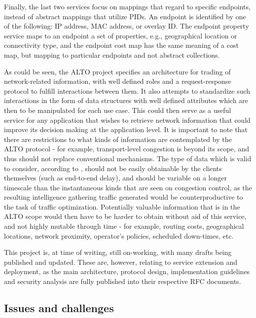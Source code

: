 \documentclass[
  oneside,
  11pt, a4paper,
  footinclude=true,
  headinclude=true,
  cleardoublepage=empty
]{scrbook}
\begin{document}
    Finally, the last two services focus on mappings that regard to specific endpoints, instead of abstract mappings that utilize PIDs. An endpoint is identified by one of the following: IP address, MAC address, or overlay ID. The endpoint property service maps to an endpoint a set of properties, e.g., geographical location or connectivity type, and the endpoint cost map has the same meaning of a cost map, but mapping to particular endpoints and not abstract collections.

    
    As could be seen, the ALTO project specifies an architecture for trading of network-related information, with well defined roles and a request-response protocol to fulfill interactions between them. It also attempts to standardize such interactions in the form of data structures with well defined attributes which are then to be manipulated for each use case. This could then serve as a useful service for any application that wishes to retrieve network information that could improve its decision making at the application level. It is important to note that there are restrictions to what kinds of information are contemplated by the ALTO protocol - for example, transport-level congestion is beyond its scope, and thus should not replace conventional mechanisms. The type of data which is valid to consider, according to \cite{alto-protocol}, should not be easily obtainable by the clients themselves (such as end-to-end delay), and should be variable on a longer timescale than the instantaneous kinds that are seen on congestion control, as the resulting intelligence gathering traffic generated would be counterproductive to the task of traffic optimization. Potentially valuable information that is in the ALTO scope would then have to be harder to obtain without aid of this service, and not highly mutable through time - for example, routing costs, geographical locations, network proximity, operator's policies, scheduled down-times, etc. 
    
    This project is, at time of writing, still on-working, with many drafts being published and updated. These are, however, relating to service extension and deployment, as the main architecture, protocol design, implementation guidelines and security analysis are fully published into their respective RFC documents.
    
    \subsection{Issues and challenges}
    
\end{document}
